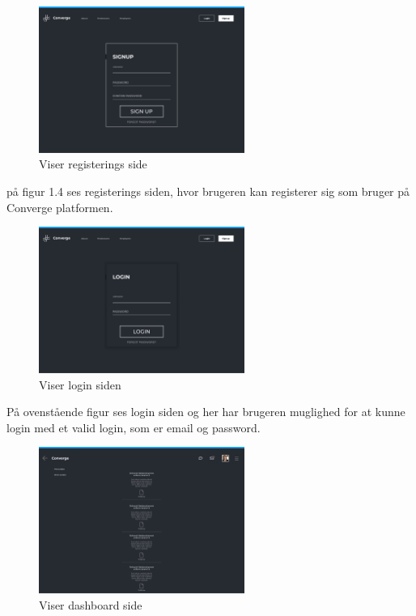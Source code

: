 \begin{figure}[ht]
    \centering
\includegraphics[width=0.6\textwidth]{system-interface-pdf/Signup.pdf}
\caption{Viser registerings side}
\label{fig:figure2}
\end{figure}

på figur 1.4 ses registerings siden, hvor brugeren kan registerer sig som bruger på Converge platformen.



\newpage
\begin{figure}[ht]
    \centering
\includegraphics[width=0.6\textwidth]{system-interface-pdf/Login.pdf}
\caption{Viser login siden}
\label{fig:figure2}
\end{figure}

På ovenstående figur ses login siden og her har brugeren muglighed for at kunne login med et valid login, som er email og password. 

\begin{figure}[ht]
    \centering
\includegraphics[width=0.6\textwidth]{system-interface-pdf/Dashboard.pdf}
\caption{Viser dashboard side}
\label{fig:figure2}
\end{figure}

